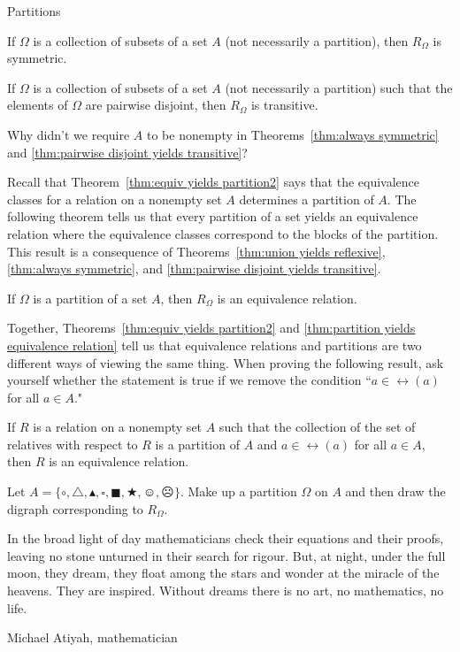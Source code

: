 \begin{section}{Partitions}
\begin{theorem}\label{thm:always symmetric}
If $\Omega$ is a collection of subsets of a set $A$ (not necessarily a partition), then $R_{\Omega}$ is symmetric.
\end{theorem}

\begin{theorem}\label{thm:pairwise disjoint yields transitive}
If $\Omega$ is a collection of subsets of a set $A$ (not necessarily a partition) such that the elements of $\Omega$ are pairwise disjoint, then $R_{\Omega}$ is transitive.
\end{theorem}

\begin{problem}
Why didn't we require $A$ to be nonempty in Theorems~\ref{thm:always symmetric} and \ref{thm:pairwise disjoint yields transitive}?
\end{problem}

Recall that Theorem~\ref{thm:equiv yields partition2} says that the equivalence classes for a relation on a nonempty set $A$ determines a partition of $A$.  The following theorem tells us that every partition of a set yields an equivalence relation where the equivalence classes correspond to the blocks of the partition. This result is a consequence of Theorems~\ref{thm:union yields reflexive}, \ref{thm:always symmetric}, and \ref{thm:pairwise disjoint yields transitive}.

\begin{theorem}\label{thm:partition yields equivalence relation}
If $\Omega$ is a partition of a set $A$, then $R_{\Omega}$ is an equivalence relation.
\end{theorem}

Together, Theorems~\ref{thm:equiv yields partition2} and \ref{thm:partition yields equivalence relation} tell us that equivalence relations and partitions are two different ways of viewing the same thing. When proving the following result, ask yourself whether the statement is true if we remove the condition ``$a\in\rel(a)$ for all $a\in A$."

\begin{theorem}\label{thm:partition yields equivalence relation}
If $R$ is a relation on a nonempty set $A$ such that the collection of the set of relatives with respect to $R$ is a partition of $A$ and $a\in\rel(a)$ for all $a\in A$, then $R$ is an equivalence relation.
\end{theorem}

\begin{problem}
Let $A=\{\circ, \triangle, \blacktriangle, \square, \blacksquare, \bigstar, \smiley, \frownie\}$.  Make up a partition $\Omega$ on $A$ and then draw the digraph corresponding to $R_{\Omega}$. 
\end{problem}

\epigraph{In the broad light of day mathematicians check their equations and their proofs, leaving no stone unturned in their search for rigour. But, at night, under the full moon, they dream, they float among the stars and wonder at the miracle of the heavens. They are inspired. Without dreams there is no art, no mathematics, no life.}{Michael Atiyah, mathematician}

\end{section}